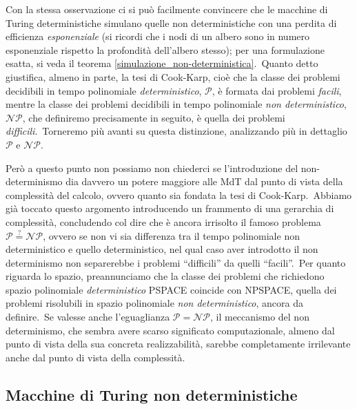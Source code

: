 Con la stessa osservazione ci si può facilmente convincere che le macchine di Turing deterministiche simulano quelle non deterministiche con una perdita di efficienza \textit{esponenziale} (si ricordi che i nodi di un albero sono in numero esponenziale rispetto la profondità dell'albero stesso); per una formulazione esatta, si veda il teorema \ref{simulazione_non-deterministica}.\
Quanto detto giustifica, almeno in parte, la tesi di Cook-Karp, cioè che la classe dei problemi decidibili in tempo polinomiale \textit{deterministico}, $\mathcal{P}$, è formata dai problemi \textit{facili}, mentre la classe dei problemi decidibili in tempo polinomiale \textit{non deterministico}, $\mathcal{NP}$, che definiremo precisamente in seguito, è quella dei problemi \textit{difficili}.\
Torneremo più avanti su questa distinzione, analizzando più in dettaglio $\mathcal{P}$ e $\mathcal{NP}$.\

Però a questo punto non possiamo non chiederci se l'introduzione del non-determinismo dia davvero un potere maggiore alle MdT dal punto di vista della complessità del calcolo, ovvero quanto sia fondata la tesi di Cook-Karp.\
Abbiamo già toccato questo argomento introducendo un frammento di una gerarchia di complessità, concludendo col dire che è ancora irrisolto il famoso problema $\mathcal{P} \stackrel{?}{=} \mathcal{NP}$, ovvero se non vi sia differenza tra il tempo polinomiale non deterministico e quello deterministico, nel qual caso aver introdotto il non determinismo non separerebbe i problemi ``difficili'' da quelli ``facili''.\
Per quanto riguarda lo spazio, preannunciamo che la classe dei problemi che richiedono spazio polinomiale \textit{deterministico} PSPACE coincide con NPSPACE, quella dei problemi risolubili in spazio polinomiale \textit{non deterministico}, ancora da definire.\
Se valesse anche l'eguaglianza $\mathcal{P} = \mathcal{NP}$, il meccanismo del non determinismo, che sembra avere scarso significato computazionale, almeno dal punto di vista della sua concreta realizzabilità, sarebbe completamente irrilevante anche dal punto di vista della complessità.\

\subsection{Macchine di Turing non deterministiche}

